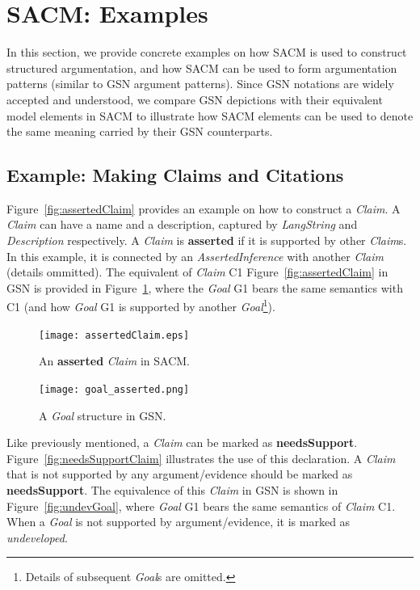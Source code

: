 \section{SACM: Examples}
In this section, we provide concrete examples on how SACM is used to construct structured argumentation, and how SACM can be used to form argumentation patterns (similar to GSN argument patterns). 
Since GSN notations are widely accepted and understood, we compare GSN depictions with their equivalent model elements in SACM to illustrate how SACM elements can be used to denote the same meaning carried by their GSN counterparts.

\subsection{Example: Making Claims and Citations}
\label{sec:claims}

Figure~\ref{fig:assertedClaim} provides an example on how to construct a \textit{Claim}. 
A \textit{Claim} can have a name and a description, captured by \textit{LangString} and \textit{Description} respectively. 
A \textit{Claim} is \textbf{asserted} if it is supported by other \textit{Claim}s. 
In this example, it is connected by an \textit{AssertedInference} with another \textit{Claim} (details ommitted). 
The equivalent of \textit{Claim} C1 Figure~\ref{fig:assertedClaim} in GSN is provided in Figure~\ref{fig:goalingsn}, where the \textit{Goal} G1 bears the same semantics with C1 (and how \textit{Goal} G1 is supported by another \textit{Goal}\footnote{Details of subsequent \textit{Goal}s are omitted.}).
\begin{figure}
	\centering
	\begin{minipage}[b]{0.7\textwidth}
		\texttt{[image: assertedClaim.eps]}
		\caption{An \textbf{asserted} \textit{Claim} in SACM.}
		\label{fig:assertedClaim}
	\end{minipage}
	\hfill
	\begin{minipage}[b]{0.28\textwidth}
		\texttt{[image: goal\_asserted.png]}
		\caption{A \textit{Goal} structure in GSN.}
		\label{fig:goalingsn}
	\end{minipage}
\end{figure}



Like previously mentioned, a \textit{Claim} can be marked as \textbf{needsSupport}. Figure~\ref{fig:needsSupportClaim} illustrates the use of this declaration. 
A \textit{Claim} that is not supported by any argument/evidence should be marked as \textbf{needsSupport}. 
The equivalence of this \textit{Claim} in GSN is shown in Figure~\ref{fig:undevGoal}, where \textit{Goal} G1 bears the same semantics of \textit{Claim} C1. 
When a \textit{Goal} is not supported by argument/evidence, it is marked as \textit{undeveloped}. 


